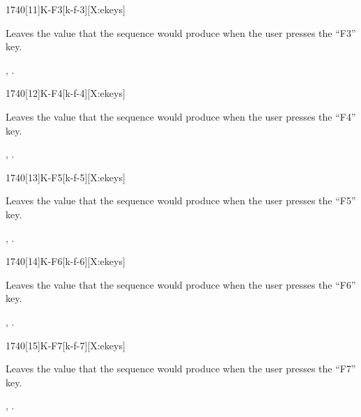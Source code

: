 \begin{worddef}{1740}[11]{K-F3}[k-f-3][X:ekeys]
\item {}

	Leaves the value  that the sequence 
	 would produce when the user presses the
	``F3'' key.

\see {},
	.
\end{worddef}


\begin{worddef}{1740}[12]{K-F4}[k-f-4][X:ekeys]
\item {}

	Leaves the value  that the sequence 
	 would produce when the user presses the
	``F4'' key.

\see {},
	.
\end{worddef}


\begin{worddef}{1740}[13]{K-F5}[k-f-5][X:ekeys]
\item {}

	Leaves the value  that the sequence 
	 would produce when the user presses the
	``F5'' key.

\see {},
	.
\end{worddef}


\begin{worddef}{1740}[14]{K-F6}[k-f-6][X:ekeys]
\item {}

	Leaves the value  that the sequence 
	 would produce when the user presses the
	``F6'' key.

\see {},
	.
\end{worddef}


\begin{worddef}{1740}[15]{K-F7}[k-f-7][X:ekeys]
\item {}

	Leaves the value  that the sequence 
	 would produce when the user presses the
	``F7'' key.

\see {},
	.
\end{worddef}


